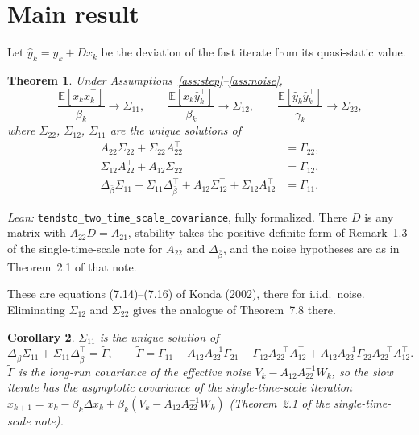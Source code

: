 \documentclass[11pt]{article}
\newtheorem{theorem}{Theorem}[section]
\newtheorem{corollary}[theorem]{Corollary}
\theoremstyle{definition}
\theoremstyle{remark}
\newcommand{\E}{\mathbb{E}}
\begin{document}
\section{Main result}

Let $\hat y_k = y_k + Dx_k$ be the deviation of the fast iterate from its quasi-static value.

\begin{theorem}\label{thm:main}
Under Assumptions~\ref{ass:step}--\ref{ass:noise},
\[
  \frac{\E[x_kx_k^\top]}{\beta_k} \to \Sigma_{11},\qquad
  \frac{\E[x_k\hat y_k^\top]}{\beta_k} \to \Sigma_{12},\qquad
  \frac{\E[\hat y_k\hat y_k^\top]}{\gamma_k} \to \Sigma_{22},
\]
where $\Sigma_{22}$, $\Sigma_{12}$, $\Sigma_{11}$ are the unique solutions of
\begin{align}
  A_{22}\Sigma_{22} + \Sigma_{22}A_{22}^\top &= \Gamma_{22}, \label{eq:s22}\\
  \Sigma_{12}A_{22}^\top + A_{12}\Sigma_{22} &= \Gamma_{12}, \label{eq:s12}\\
  \Delta_{\bar\beta}\Sigma_{11} + \Sigma_{11}\Delta_{\bar\beta}^\top + A_{12}\Sigma_{12}^\top + \Sigma_{12}A_{12}^\top
    &= \Gamma_{11}. \label{eq:s11}
\end{align}
\end{theorem}

\noindent\emph{Lean:} \texttt{tendsto\_two\_time\_scale\_covariance}, fully formalized. There $D$ is
any matrix with $A_{22}D = A_{21}$, stability takes the positive-definite form of Remark~1.3 of the
single-time-scale note for $A_{22}$ and $\Delta_{\bar\beta}$, and the noise hypotheses are as in
Theorem~2.1 of that note.

These are equations (7.14)--(7.16) of Konda (2002), there for i.i.d.\ noise. Eliminating
$\Sigma_{12}$ and $\Sigma_{22}$ gives the analogue of Theorem~7.8 there.

\begin{corollary}\label{cor:eff}
$\Sigma_{11}$ is the unique solution of
\[
  \Delta_{\bar\beta}\Sigma_{11} + \Sigma_{11}\Delta_{\bar\beta}^\top = \tilde\Gamma,\qquad
  \tilde\Gamma = \Gamma_{11} - A_{12}A_{22}^{-1}\Gamma_{21} - \Gamma_{12}A_{22}^{-\top}A_{12}^\top
    + A_{12}A_{22}^{-1}\Gamma_{22}A_{22}^{-\top}A_{12}^\top .
\]
$\tilde\Gamma$ is the long-run covariance of the effective noise $V_k - A_{12}A_{22}^{-1}W_k$, so
the slow iterate has the asymptotic covariance of the single-time-scale iteration
$x_{k+1} = x_k - \beta_k\Delta x_k + \beta_k(V_k - A_{12}A_{22}^{-1}W_k)$ (Theorem~2.1 of the
single-time-scale note).
\end{corollary}
\end{document}
